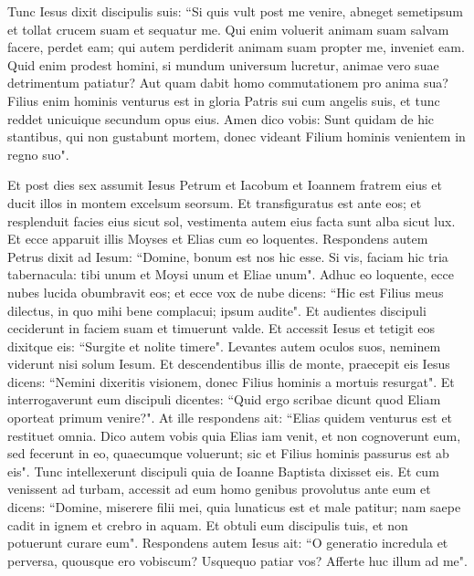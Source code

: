 \begin{biblechapter}
\verse Tunc Iesus dixit discipulis suis: “Si quis vult post me venire, abneget semetipsum et tollat crucem suam et sequatur me. 
\verse Qui enim voluerit animam suam salvam facere, perdet eam; qui autem perdiderit animam suam propter me, inveniet eam. 
\verse Quid enim prodest homini, si mundum universum lucretur, animae vero suae detrimentum patiatur? Aut quam dabit homo commutationem pro anima sua? 
\verse Filius enim hominis venturus est in gloria Patris sui cum angelis suis, et tunc reddet unicuique secundum opus eius. 
\verse Amen dico vobis: Sunt quidam de hic stantibus, qui non gustabunt mortem, donec videant Filium hominis venientem in regno suo". 
\end{biblechapter}

\begin{biblechapter}  
\verse Et post dies sex assumit Iesus Petrum et Iacobum et Ioannem fratrem eius et ducit illos in montem excelsum seorsum. 
\verse Et transfiguratus est ante eos; et resplenduit facies eius sicut sol, vestimenta autem eius facta sunt alba sicut lux. 
\verse Et ecce apparuit illis Moyses et Elias cum eo loquentes. 
\verse Respondens autem Petrus dixit ad Iesum: “Domine, bonum est nos hic esse. Si vis, faciam hic tria tabernacula: tibi unum et Moysi unum et Eliae unum". 
\verse Adhuc eo loquente, ecce nubes lucida obumbravit eos; et ecce vox de nube dicens: “Hic est Filius meus dilectus, in quo mihi bene complacui; ipsum audite". 
\verse Et audientes discipuli ceciderunt in faciem suam et timuerunt valde. 
\verse Et accessit Iesus et tetigit eos dixitque eis: “Surgite et nolite timere".  
\verse Levantes autem oculos suos, neminem viderunt nisi solum Iesum. 
\verse Et descendentibus illis de monte, praecepit eis Iesus dicens: “Nemini dixeritis visionem, donec Filius hominis a mortuis resurgat". 
\verse Et interrogaverunt eum discipuli dicentes: “Quid ergo scribae dicunt quod Eliam oporteat primum venire?". 
\verse At ille respondens ait: “Elias quidem venturus est et restituet omnia. 
\verse Dico autem vobis quia Elias iam venit, et non cognoverunt eum, sed fecerunt in eo, quaecumque voluerunt; sic et Filius hominis passurus est ab eis". 
\verse Tunc intellexerunt discipuli quia de Ioanne Baptista dixisset eis. 
\verse Et cum venissent ad turbam, accessit ad eum homo genibus provolutus ante eum 
\verse et dicens: “Domine, miserere filii mei, quia lunaticus est et male patitur; nam saepe cadit in ignem et crebro in aquam. 
\verse Et obtuli eum discipulis tuis, et non potuerunt curare eum". 
\verse Respondens autem Iesus ait: “O generatio incredula et perversa, quousque ero vobiscum? Usquequo patiar vos? Afferte huc illum ad me". 

\end{biblechapter}

